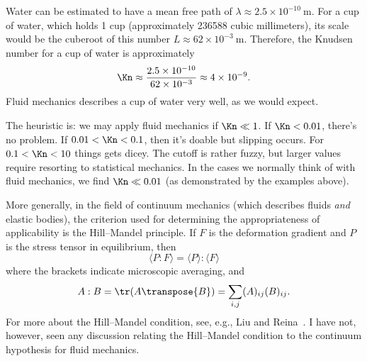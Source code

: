 \begin{node}
\begin{definition}
\begin{example}\label{fluids:describing-000G}%
Water can be estimated to have a mean free path of
$\lambda\approx2.5\times10^{-10}~\mathrm{m}$. For a cup of water, which
holds 1 cup (approximately 236588 cubic millimeters), its scale would be
the cuberoot of this number $L\approx 62\times10^{-3}~\mathrm{m}$.
Therefore, the Knudsen number for a cup of water is approximately
\begin{equation}
\Kn\approx\frac{2.5\times10^{-10}}{62\times10^{-3}}\approx4\times10^{-9}.
\end{equation}
Fluid mechanics describes a cup of water very well, as we would expect.
\end{example}
\end{definition}

\begin{node}\label{fluids:describing-000D}%
The heuristic is: we may apply fluid mechanics if $\Kn\ll1$. If
$\Kn<0.01$, there's no problem. If $0.01<\Kn<0.1$, then it's
doable but slipping occurs. For $0.1<\Kn<10$ things gets dicey. The
cutoff is rather fuzzy, but larger values require resorting to
statistical mechanics. In the cases we normally think of with fluid
mechanics, we find $\Kn\ll0.01$ (as demonstrated by the examples above).
\end{node}

\begin{node}\label{fluids:describing-000F}%
More generally, in the field of continuum mechanics (which describes
fluids \emph{and} elastic bodies), the criterion used for determining
the appropriateness of applicability is the Hill--Mandel principle. If
$F$ is the deformation gradient and $P$ is the stress tensor in
equilibrium, then
\begin{equation}
\langle P : F\rangle = \langle P \rangle : \langle F \rangle
\end{equation}
where the brackets indicate microscopic averaging, and
\begin{equation*}
A : B = \tr(A\transpose{B}) = \sum_{i,j}(A)_{ij}(B)_{ij}.
\end{equation*}
For more about the Hill--Mandel condition, see, e.g., Liu and
Reina~\cite{liu2016discrete}. I have not, however, seen any discussion
relating the Hill--Mandel condition to the continuum hypothesis for
fluid mechanics.
\end{node}
\end{node}